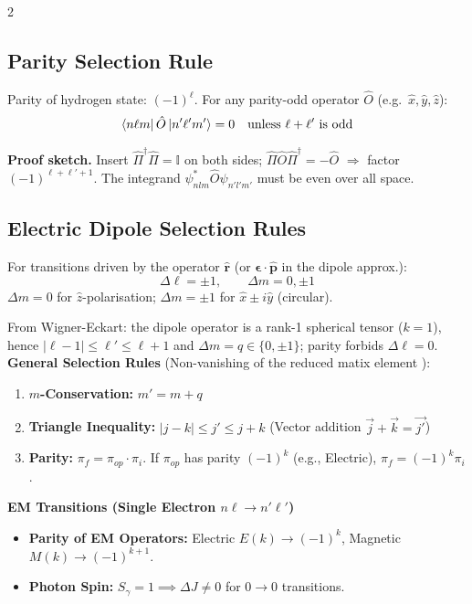 \documentclass[9pt,a4paper]{article} %
\newcommand{\bs}[1]{\symbf{#1}}\usepackage{empheq}   %
\newcommand{\Id}{\mathbb{I}}
\begin{document}
\begin{multicols}{2}
\subsection{Parity Selection Rule}
Parity of hydrogen state: $(-1)^\ell$.  For any parity-odd operator $\hat{O}$ (e.g.\ $\hat{x},\hat{y},\hat{z}$):
\[
\bra{n\ell m}\hat{O}\ket{n'\ell' m'}=0 \quad\text{unless }\ell+\ell'\text{ is odd}
\]

\textbf{Proof sketch.} Insert $\hat{\Pi}^\dagger\hat{\Pi}=\Id$ on both sides; $\hat{\Pi}\hat{O}\hat{\Pi}^\dagger=-\hat{O}$ $\Rightarrow$ factor $(-1)^{\ell+\ell'+1}$.
The integrand $\psi_{nlm}^* \hat{O} \psi_{n'l'm'}$ must be even over all space.

\subsection{Electric Dipole Selection Rules}
For transitions driven by the operator $\hat{\mathbf{r}}$ (or $\bs{\epsilon}\cdot\hat{\mathbf{p}}$ in the dipole approx.):
\[
\boxed{\Delta\ell=\pm 1,\qquad \Delta m=0,\pm 1}
\]
$\Delta m=0$ for $\hat{z}$-polarisation; $\Delta m=\pm 1$ for $\hat{x}\pm i\hat{y}$ (circular).

From Wigner-Eckart: the dipole operator is a rank-1 spherical tensor ($k=1$), hence $|\ell-1|\le\ell'\le\ell+1$ and $\Delta m=q\in\{0,\pm 1\}$; parity forbids $\Delta\ell=0$.
\textbf{General Selection Rules} (Non-vanishing of the reduced matix element ):
\begin{enumerate}
    \item \textbf{$m$-Conservation:} $m' = m + q$
    \item \textbf{Triangle Inequality:} $|j - k| \le j' \le j + k$ (Vector addition $\vec{j} + \vec{k} = \vec{j'}$)
    \item \textbf{Parity:} $\pi_f = \pi_{op} \cdot \pi_i$. If $\pi_{op}$ has parity $(-1)^k$ (e.g., Electric), $\pi_f = (-1)^k \pi_i$.
\end{enumerate}

\textbf{EM Transitions (Single Electron $n\ell \to n'\ell'$)}
\begin{itemize}
    \item \textbf{Parity of EM Operators:} Electric $E(k) \to (-1)^k$, Magnetic $M(k) \to (-1)^{k+1}$.
    \item \textbf{Photon Spin:} $S_{\gamma}=1 \implies \Delta J \neq 0$ for $0 \to 0$ transitions.
\end{itemize}


\end{multicols}
\end{document}
